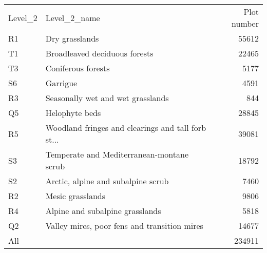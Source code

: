 \begin{tabular}{llr}
\toprule
Level\_2 &                                       Level\_2\_name &  Plot number \\
     R1 &                                     Dry grasslands &        55612 \\
\midrule
     T1 &                      Broadleaved deciduous forests &        22465 \\
     T3 &                                 Coniferous forests &         5177 \\
     S6 &                                           Garrigue &         4591 \\
     R3 &                  Seasonally wet and wet grasslands &          844 \\
     Q5 &                                     Helophyte beds &        28845 \\
     R5 & Woodland fringes and clearings and tall forb st... &        39081 \\
     S3 &         Temperate and Mediterranean-montane scrub  &        18792 \\
     S2 &                 Arctic, alpine and subalpine scrub &         7460 \\
     R2 &                                   Mesic grasslands &         9806 \\
     R4 &                   Alpine and subalpine grasslands  &         5818 \\
     Q2 &       Valley mires, poor fens and transition mires &        14677 \\
    All &                                                    &       234911 \\
\bottomrule
\end{tabular}

